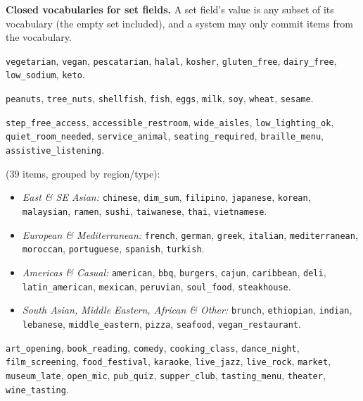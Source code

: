 \documentclass{article}
\begin{document}
\textbf{Closed vocabularies for set fields.} A set field's value is any subset of its vocabulary
(the empty set included), and a system may only commit items from the vocabulary.
\begin{description}\setlength{\itemsep}{1pt}\small
  \item[\texttt{dietary}] \texttt{vegetarian}, \texttt{vegan}, \texttt{pescatarian}, \texttt{halal}, \texttt{kosher}, \texttt{gluten\_free}, \texttt{dairy\_free}, \texttt{low\_sodium}, \texttt{keto}.
  \item[\texttt{allergies}] \texttt{peanuts}, \texttt{tree\_nuts}, \texttt{shellfish}, \texttt{fish}, \texttt{eggs}, \texttt{milk}, \texttt{soy}, \texttt{wheat}, \texttt{sesame}.
  \item[\texttt{accessibility\_needs}] \texttt{step\_free\_access}, \texttt{accessible\_restroom}, \texttt{wide\_aisles}, \texttt{low\_lighting\_ok}, \texttt{quiet\_room\_needed}, \texttt{service\_animal}, \texttt{seating\_required}, \texttt{braille\_menu}, \texttt{assistive\_listening}.
  \item[\texttt{cuisines\_liked}, \texttt{cuisines\_avoided}] (39 items, grouped by region/type):
    \begin{itemize}[leftmargin=*, itemsep=0pt, topsep=1pt]
      \item \emph{East \& SE Asian:} \texttt{chinese}, \texttt{dim\_sum}, \texttt{filipino}, \texttt{japanese}, \texttt{korean}, \texttt{malaysian}, \texttt{ramen}, \texttt{sushi}, \texttt{taiwanese}, \texttt{thai}, \texttt{vietnamese}.
      \item \emph{European \& Mediterranean:} \texttt{french}, \texttt{german}, \texttt{greek}, \texttt{italian}, \texttt{mediterranean}, \texttt{moroccan}, \texttt{portuguese}, \texttt{spanish}, \texttt{turkish}.
      \item \emph{Americas \& Casual:} \texttt{american}, \texttt{bbq}, \texttt{burgers}, \texttt{cajun}, \texttt{caribbean}, \texttt{deli}, \texttt{latin\_american}, \texttt{mexican}, \texttt{peruvian}, \texttt{soul\_food}, \texttt{steakhouse}.
      \item \emph{South Asian, Middle Eastern, African \& Other:} \texttt{brunch}, \texttt{ethiopian}, \texttt{indian}, \texttt{lebanese}, \texttt{middle\_eastern}, \texttt{pizza}, \texttt{seafood}, \texttt{vegan\_restaurant}.
    \end{itemize}
  \item[\texttt{event\_types\_liked}, \texttt{event\_types\_avoided}] \texttt{art\_opening}, \texttt{book\_reading}, \texttt{comedy}, \texttt{cooking\_class}, \texttt{dance\_night}, \texttt{film\_screening}, \texttt{food\_festival}, \texttt{karaoke}, \texttt{live\_jazz}, \texttt{live\_rock}, \texttt{market}, \texttt{museum\_late}, \texttt{open\_mic}, \texttt{pub\_quiz}, \texttt{supper\_club}, \texttt{tasting\_menu}, \texttt{theater}, \texttt{wine\_tasting}.
\end{description}
\end{document}
